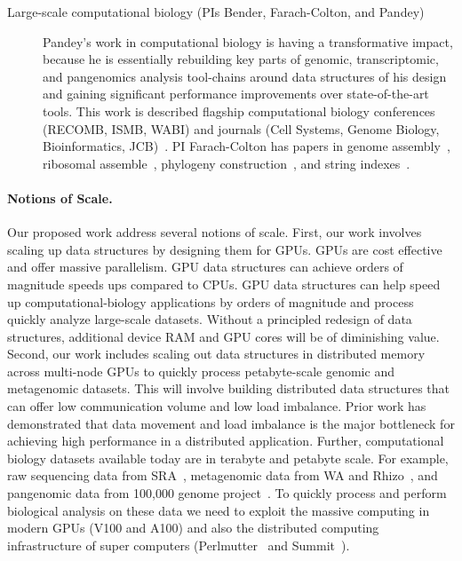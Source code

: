 \begin{description}
    \item[Large-scale computational biology (PIs Bender, Farach-Colton, and Pandey)] Pandey's work in computational biology is having a transformative impact, because he is essentially rebuilding key parts of genomic, transcriptomic, and pangenomics analysis tool-chains around data structures of his design and gaining significant performance improvements over state-of-the-art tools. 
    This work is described flagship computational biology conferences (RECOMB, ISMB, WABI) and journals (Cell Systems, Genome Biology, Bioinformatics, JCB)~\cite{PandeyABFJP18Cell,PandeyBJP17a,PandeyBJP17b,AlmodaresiPFJP19,AlmodaresiPFJP20,pandey2021variantstore,almodaresi2017rainbowfish,almodaresi2022incrementally}.  PI Farach-Colton has papers in genome assembly~\cite{vicky-choi}, ribosomal assemble~\cite{gabriela-hristescu}, phylogeny construction~\cite{kannan-papers-from-90s,numerical-taxonomy}, and string indexes~\cite{suffix-tree-stuff}.

\end{description}


\paragraph{Notions of Scale.}
Our proposed work address several notions of scale.
First, our work involves scaling up data structures by designing them for GPUs. GPUs are cost effective and offer massive parallelism. GPU data structures can achieve orders of magnitude speeds ups compared to CPUs. GPU data structures can help speed up computational-biology applications by orders of magnitude and process quickly analyze large-scale datasets. Without a principled redesign of data structures, additional device RAM and GPU cores will be of diminishing value.
Second, our work includes scaling out data structures in distributed memory across multi-node GPUs to quickly process petabyte-scale genomic and metagenomic datasets. This will involve building distributed data structures that can offer low communication volume and low load imbalance. Prior work has demonstrated that data movement and load imbalance is the major bottleneck for achieving high performance in a distributed application.
Further, computational biology datasets available today are in terabyte and petabyte scale. For example, raw sequencing data from SRA~\cite{kodama2012sequence}, metagenomic data from WA and Rhizo~\cite{hofmeyr2020terabase}, and pangenomic data from 100,000 genome project~\cite{1002021100}. To quickly process and perform biological analysis on these data we need to exploit the massive computing in modern GPUs (V100 and A100) and also the distributed computing infrastructure of super computers (Perlmutter~\cite{perlmutter} and Summit~\cite{summit}).
